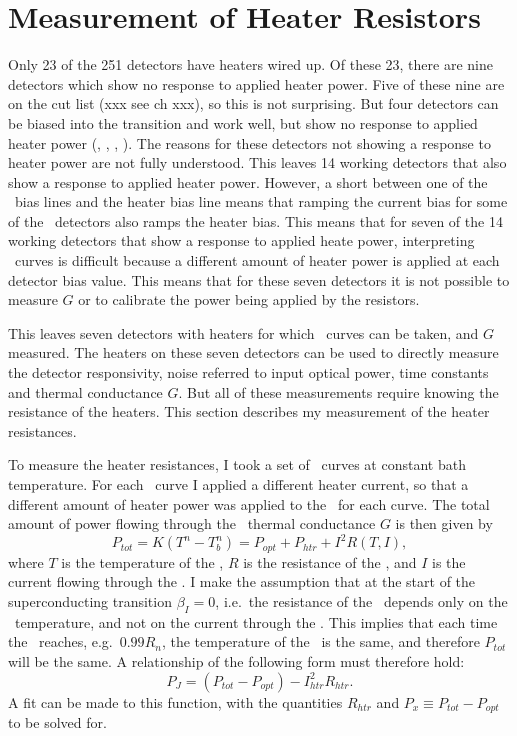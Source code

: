 \section{Measurement of Heater Resistors}

Only 23 of the 251 detectors have heaters wired up.
Of these 23, there are nine detectors which show no response to applied heater power.
Five of these nine are on the cut list (xxx see ch xxx), so this is not surprising.
But four detectors can be biased into the transition and work well, but show no response to applied heater power (, , , ).
The reasons for these detectors not showing a response to heater power are not fully understood.
This leaves 14 working detectors that also show a response to applied heater power.
However, a short between one of the \TES\ bias lines and the heater bias line means that ramping the current bias for some of the \TES\ detectors also ramps the heater bias.
This means that for seven of the 14 working detectors that show a response to applied heate power, interpreting \IV\ curves is difficult because a different amount of heater power is applied at each detector bias value.
This means that for these seven detectors it is not possible to measure $G$ or to calibrate the power being applied by the resistors.

This leaves seven detectors with heaters for which \IV\ curves can be taken, and $G$ measured.
The heaters on these seven detectors can be used to directly measure the detector responsivity, noise referred to input optical power, time constants and thermal conductance $G$.
But all of these measurements require knowing the resistance of the heaters.
This section describes my measurement of the heater resistances.

To measure the heater resistances, I took a set of \IV\ curves at constant bath temperature.
For each \IV\ curve I applied a different heater current, so that a different amount of heater power was applied to the \TES\ for each curve.
The total amount of power flowing through the \TES\ thermal conductance $G$ is then given by
\begin{equation}\label{eqn:tes-ptot}
P_{tot} = K(T^n - T_b^n) = P_{opt} + P_{htr} + I^2 R(T,I),
\end{equation}
where $T$ is the temperature of the \TES, $R$ is the resistance of the \TES, and $I$ is the current flowing through the \TES.
I make the assumption that at the start of the superconducting transition $\beta_I = 0$, i.e.\ the resistance of the \TES\ depends only on the \TES\ temperature, and not on the current through the \TES.
This implies that each time the \TES\ reaches, e.g.\ $0.99R_n$, the temperature of the \TES\ is the same, and therefore $P_{tot}$ will be the same.
A relationship of the following form must therefore hold:
\begin{equation}\label{eqn:rhtr-fit}
P_{J} = (P_{tot} - P_{opt}) - I_{htr}^2 R_{htr}.
\end{equation}
A fit can be made to this function, with the quantities $R_{htr}$ and $P_{x} \equiv P_{tot} - P_{opt}$ to be solved for.

